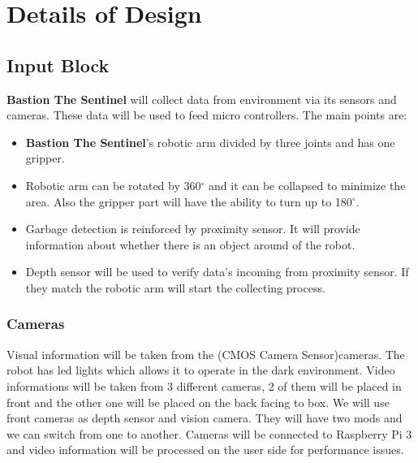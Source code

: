 \documentclass[12pt,a4paper]{article}
\begin{document}
 \section{Details of Design}
  
   \subsection{Input Block}
    \begin{flushleft}
     \textbf{Bastion The Sentinel} will collect data from environment via its sensors and cameras. These data will be used to 
     feed micro controllers. The main points are:
     \begin{itemize}
      \item \textbf{Bastion The Sentinel}'s robotic arm divided by three joints and has one gripper.
      \item Robotic arm can be rotated by 360$^{\circ}$ and it can be collapsed to minimize the area. Also the gripper part will 
      have the ability to turn up to 180$^{\circ}$.
      \item Garbage detection is reinforced by proximity sensor. It will provide information about whether there is an object around 
      of the robot.
      \item Depth sensor will be used to verify data's incoming from proximity sensor. If they match the robotic arm will start the 
      collecting process.
     \end{itemize}

    \end{flushleft}

    \subsubsection{Cameras}
     \begin{flushleft}
      Visual information will be taken from the (CMOS Camera Sensor)cameras. The robot has led lights which allows it to 
      operate in the dark environment. Video informations will be taken from 3 different cameras, 2 of them will be placed 
      in front and the other one will be placed on the back facing to box. We will use front cameras as depth sensor and vision 
      camera. They will have two mods and we can switch from one to another. Cameras will be connected to Raspberry Pi 3 and 
      video information will be processed on the user side for performance issues.
     \end{flushleft}
     
\end{document}
